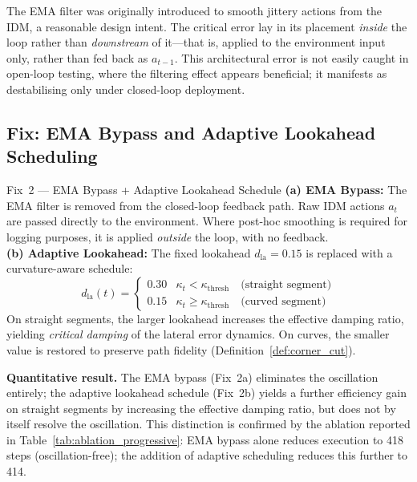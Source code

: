 \documentclass[12pt, a4paper, oneside]{report}
\theoremstyle{definition}
\newcommand{\dlookahead}{d_{\mathrm{la}}}
\begin{document}
The EMA filter was originally introduced to smooth jittery actions
from the IDM, a reasonable design intent. The critical error lay in
its placement \emph{inside} the loop rather than \emph{downstream}
of it---that is, applied to the environment input only, rather than
fed back as $a_{t-1}$. This architectural error is not easily
caught in open-loop testing, where the filtering effect appears
beneficial; it manifests as destabilising only under closed-loop
deployment.

\subsection{Fix: EMA Bypass and Adaptive Lookahead Scheduling}
\label{sec:fm2_fix}

\begin{fixbox}{Fix~2 --- EMA Bypass + Adaptive Lookahead Schedule}
\textbf{(a) EMA Bypass:}
The EMA filter is removed from the closed-loop feedback path.
Raw IDM actions $a_t$ are passed directly to the environment.
Where post-hoc smoothing is required for logging purposes, it is
applied \emph{outside} the loop, with no feedback.\\[6pt]
\textbf{(b) Adaptive Lookahead:}
The fixed lookahead $\dlookahead = 0.15$ is replaced with a
curvature-aware schedule:
\[
  \dlookahead(t) = \begin{cases}
    0.30 & \kappa_t < \kappa_{\mathrm{thresh}}
           \quad \text{(straight segment)} \\
    0.15 & \kappa_t \geq \kappa_{\mathrm{thresh}}
           \quad \text{(curved segment)}
  \end{cases}
\]
On straight segments, the larger lookahead increases the effective
damping ratio, yielding \emph{critical damping} of the lateral
error dynamics. On curves, the smaller value is restored to
preserve path fidelity (Definition~\ref{def:corner_cut}).
\end{fixbox}

\textbf{Quantitative result.}
The EMA bypass (Fix~2a) eliminates the oscillation entirely; the
adaptive lookahead schedule (Fix~2b) yields a further efficiency
gain on straight segments by increasing the effective damping
ratio, but does not by itself resolve the oscillation. This
distinction is confirmed by the ablation reported in
Table~\ref{tab:ablation_progressive}: EMA bypass alone reduces
execution to 418 steps (oscillation-free); the addition of adaptive
scheduling reduces this further to 414.

\end{document}
